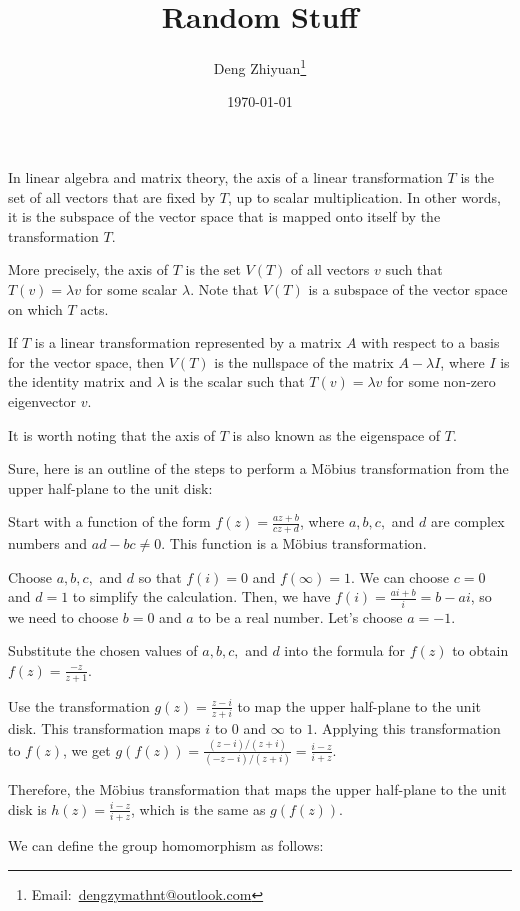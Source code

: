 \documentclass[12pt,a4paper,english]{article}
\title{Random Stuff}
\date{\today}
\author{Deng Zhiyuan\footnote{Email:\ \href{mailto:dengzymathnt@outlook.com}{dengzymathnt@outlook.com}}}
\theoremstyle{plain}
\theoremstyle{definition}
\theoremstyle{remark}
\begin{document}
\maketitle
\newpage
In linear algebra and matrix theory, the axis of a linear transformation $T$ is the set of all vectors that are fixed by $T$, up to scalar multiplication. In other words, it is the subspace of the vector space that is mapped onto itself by the transformation $T$.

More precisely, the axis of $T$ is the set $V(T)$ of all vectors $v$ such that $T(v) = \lambda v$ for some scalar $\lambda$. Note that $V(T)$ is a subspace of the vector space on which $T$ acts.

If $T$ is a linear transformation represented by a matrix $A$ with respect to a basis for the vector space, then $V(T)$ is the nullspace of the matrix $A - \lambda I$, where $I$ is the identity matrix and $\lambda$ is the scalar such that $T(v) = \lambda v$ for some non-zero eigenvector $v$.

It is worth noting that the axis of $T$ is also known as the eigenspace of $T$.

Sure, here is an outline of the steps to perform a Möbius transformation from the upper half-plane to the unit disk:

Start with a function of the form $f(z) = \frac{az + b}{cz + d}$, where $a,b,c,$ and $d$ are complex numbers and $ad-bc\neq 0$. This function is a Möbius transformation.

Choose $a,b,c,$ and $d$ so that $f(i) = 0$ and $f(\infty) = 1$. We can choose $c = 0$ and $d = 1$ to simplify the calculation. Then, we have $f(i) = \frac{ai+b}{i} = b - ai$, so we need to choose $b = 0$ and $a$ to be a real number. Let's choose $a = -1$.

Substitute the chosen values of $a,b,c,$ and $d$ into the formula for $f(z)$ to obtain $f(z) = \frac{-z}{z + 1}$.

Use the transformation $g(z) = \frac{z-i}{z+i}$ to map the upper half-plane to the unit disk. This transformation maps $i$ to $0$ and $\infty$ to $1$. Applying this transformation to $f(z)$, we get $g(f(z)) = \frac{(z-i)/(z+i)}{(-z-i)/(z+i)} = \frac{i-z}{i+z}$.

Therefore, the Möbius transformation that maps the upper half-plane to the unit disk is $h(z) = \frac{i-z}{i+z}$, which is the same as $g(f(z))$.




We can define the group homomorphism as follows:
\end{document}
